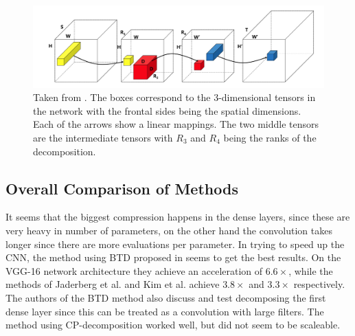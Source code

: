 \begin{figure}
    \centering
    \includegraphics[width=\linewidth]{Pics/03_Previous_work/tuckerDecomp.png}
    \captionsetup{width=.95\linewidth}
    \caption{Taken from \cite{Kim2016}. The boxes correspond to the 3-dimensional tensors in the network with the frontal sides being the spatial dimensions. Each of the arrows show a linear mappings. The two middle tensors are the intermediate tensors with $R_3$ and $R_4$ being the ranks of the decomposition.}
    \label{fig:tuckerDecompConv}
\end{figure}

\subsection{Overall Comparison of Methods}
It seems that the biggest compression happens in the dense layers, since these are very heavy in number of parameters, on the other hand the convolution takes longer since there are more evaluations per parameter. In trying to speed up the CNN, the method using BTD proposed in \cite{Wang2016} seems to get the best results. On the VGG-16 network architecture\cite{Simonyan2015} they achieve an acceleration of $6.6 \times$, while the methods of Jaderberg et al. \cite{Jaderberg2014} and Kim et al. \cite{Kim2016} achieve $3.8 \times$ and $3.3\times$ respectively. The authors of the BTD method also discuss and test decomposing the first dense layer since this can be treated as a convolution with large filters. The method using CP-decomposition \cite{Lebedev2015} worked well, but did not seem to be scaleable.
